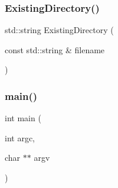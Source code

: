 \subsubsection{\texorpdfstring{Existing\+Directory()}{ExistingDirectory()}}
{\footnotesize\ttfamily std\+::string Existing\+Directory (\begin{DoxyParamCaption}\item[{const std\+::string \&}]{filename }\end{DoxyParamCaption})\hspace{0.3cm}{\ttfamily [inline]}}

\mbox{\label{irk-query_8cpp_a3c04138a5bfe5d72780bb7e82a18e627}} 
\subsubsection{\texorpdfstring{main()}{main()}}
{\footnotesize\ttfamily int main (\begin{DoxyParamCaption}\item[{int}]{argc,  }\item[{char $\ast$$\ast$}]{argv }\end{DoxyParamCaption})}

